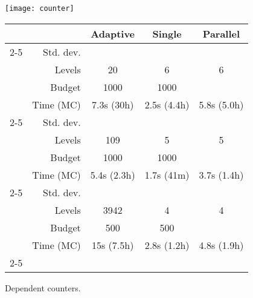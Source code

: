 \documentclass{llncs}
\providecommand{\tabularnewline}{\\}
\begin{document}
\begin{figure}
\begin{minipage}[t]{0.48\columnwidth}\texttt{[image: counter]}

\protect\caption{Dependent counters.\label{fig:counters}}
\end{minipage}\quad{}\begin{minipage}[t]{0.5\columnwidth}\textsf{\scriptsize{}}\begin{tabular}[b]{r|rccc|}
\multicolumn{1}{r}{} &  & \textsf{\scriptsize{}Adaptive} & \textsf{\scriptsize{}Single} & \multicolumn{1}{c}{\textsf{\scriptsize{}Parallel}}\tabularnewline
\cline{2-5} 
\multirow{4}{*}{\begin{turn}{90}
\textsf{\scriptsize{}Leader}
\end{turn}} & \textsf{\scriptsize{}Std. dev.} & \textsf{\scriptsize{}} & \textsf{\scriptsize{}} & \textsf{\scriptsize{}}\tabularnewline
 & \textsf{\scriptsize{}Levels} & \textsf{\scriptsize{}20} & \textsf{\scriptsize{}6} & \textsf{\scriptsize{}6}\tabularnewline
 & \textsf{\scriptsize{}Budget} & \textsf{\scriptsize{}1000} & \textsf{\scriptsize{}1000} & \textsf{\scriptsize{}}\tabularnewline
 & \textsf{\scriptsize{}Time (MC)} & \textsf{\scriptsize{}7.3s (30h)} & \textsf{\scriptsize{}2.5s (4.4h)} & \textsf{\scriptsize{}5.8s (5.0h)}\tabularnewline
\cline{2-5} 
\multirow{4}{*}{\begin{turn}{90}
\textsf{\scriptsize{}Philosophers}
\end{turn}} & \textsf{\scriptsize{}Std. dev.} & \textsf{\scriptsize{}} & \textsf{\scriptsize{}} & \textsf{\scriptsize{}}\tabularnewline
 & \textsf{\scriptsize{}Levels} & \textsf{\scriptsize{}109} & \textsf{\scriptsize{}5} & \textsf{\scriptsize{}5}\tabularnewline
 & \textsf{\scriptsize{}Budget} & \textsf{\scriptsize{}1000} & \textsf{\scriptsize{}1000} & \textsf{\scriptsize{}}\tabularnewline
 & \textsf{\scriptsize{}Time (MC)} & \textsf{\scriptsize{}5.4s (2.3h)} & \textsf{\scriptsize{}1.7s (41m)} & \textsf{\scriptsize{}3.7s (1.4h)}\tabularnewline
\cline{2-5} 
\multirow{4}{*}{\begin{turn}{90}
\textsf{\scriptsize{}Counters}
\end{turn}} & \textsf{\scriptsize{}Std. dev.} & \textsf{\scriptsize{}} & \textsf{\scriptsize{}} & \textsf{\scriptsize{}}\tabularnewline
 & \textsf{\scriptsize{}Levels} & \textsf{\scriptsize{}3942} & \textsf{\scriptsize{}4} & \textsf{\scriptsize{}4}\tabularnewline
 & \textsf{\scriptsize{}Budget} & \textsf{\scriptsize{}500} & \textsf{\scriptsize{}500} & \textsf{\scriptsize{}}\tabularnewline
 & \textsf{\scriptsize{}Time (MC)} & \textsf{\scriptsize{}15s (7.5h)} & \textsf{\scriptsize{}2.8s (1.2h)} & \textsf{\scriptsize{}4.8s (1.9h)}\tabularnewline
\cline{2-5} 
\end{tabular}{\scriptsize \par}

\end{minipage}
\end{figure}
\end{document}
